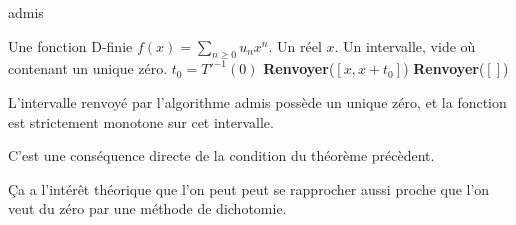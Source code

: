 \documentclass[a4paper,10.5pt]{article}
\begin{document}
	
	\begin{algorithm}
		\caption{admis}
		
		\begin{algorithmic}[1]
			\REQUIRE Une fonction D-finie $f(x)=\sum_{n \geq 0} u_nx^{n}$. Un réel $x$. 
			\ENSURE Un intervalle, vide où contenant un unique zéro.
			\STATE $t_0=T'^{-1}(0)$
			\STATE \textbf{Renvoyer}($[x,x+t_0]$)
			\ENDIF
			\STATE \textbf{Renvoyer}($[]$)
		\end{algorithmic}
	\end{algorithm}

	\begin{proposition}
		L'intervalle renvoyé par l'algorithme admis possède un unique zéro, et la fonction est strictement monotone sur cet intervalle.
	\end{proposition}
	\begin{demonstration}
		C'est une conséquence directe de la condition du théorème précèdent.
	\end{demonstration}
	
	Ça a l'intérêt théorique que l'on peut peut se rapprocher aussi proche que l'on veut du zéro par une méthode de dichotomie.
\end{document}
